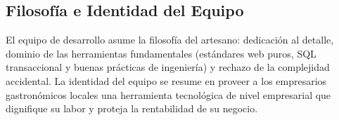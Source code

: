 \subsection{Filosofía e Identidad del Equipo}
El equipo de desarrollo asume la filosofía del artesano: dedicación al detalle, dominio de las herramientas fundamentales (estándares web puros, SQL transaccional y buenas prácticas de ingeniería) y rechazo de la complejidad accidental. La identidad del equipo se resume en proveer a los empresarios gastronómicos locales una herramienta tecnológica de nivel empresarial que dignifique su labor y proteja la rentabilidad de su negocio.
